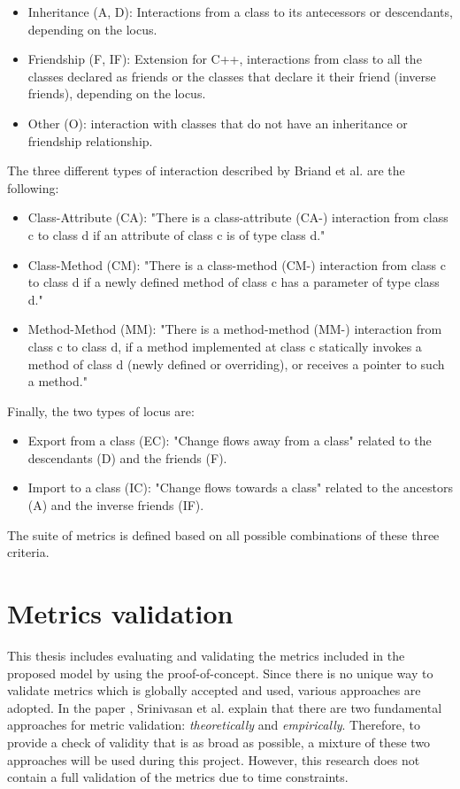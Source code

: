 \begin{itemize}
  \item Inheritance (A, D): Interactions from a class to its antecessors or descendants, depending on the locus.
  \item Friendship (F, IF): Extension for C++, interactions from class to all the classes declared as friends or the classes that declare it their friend (inverse friends), depending on the locus.
  \item Other (O): interaction with classes that do not have an inheritance or friendship relationship.
\end{itemize}

\blankls
The three different types of interaction described by Briand et al. \cite{briand1997investigation} are the following:
\begin{itemize}
    \item Class-Attribute (CA): "There is a class-attribute (CA-) interaction from class c to class d if an attribute of class c is of type class d."
    \item Class-Method (CM): "There is a class-method (CM-) interaction from class c to class d if a newly defined method of class c has a parameter of type class d."
    \item Method-Method (MM): "There is a method-method (MM-) interaction from class c to class d, if a method implemented at class c statically invokes a method of class d (newly defined or overriding), or receives a pointer to such a method."
\end{itemize}

\blankls
Finally, the two types of locus are:
\begin{itemize}
  \item Export from a class (EC): "Change flows away from a class" related to the descendants (D) and the friends (F).
  \item Import to a class (IC): "Change flows towards a class" related to the ancestors (A) and the inverse friends (IF).
\end{itemize}

\blankls
The suite of metrics is defined based on all possible combinations of these three criteria.

\section{Metrics validation}
This thesis includes evaluating and validating the metrics included in the proposed model by using the proof-of-concept. Since there is no unique way to validate metrics which is globally accepted and used, various approaches are adopted. In the paper \cite{srinivasan2014software}, Srinivasan et al. explain that there are two fundamental approaches for metric validation: \textit{theoretically} and \textit{empirically}. Therefore, to provide a check of validity that is as broad as possible, a mixture of these two approaches will be used during this project. However, this research does not contain a full validation of the metrics due to time constraints.

